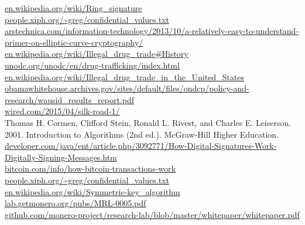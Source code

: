 \documentclass[12pt]{article}
\begin{document}
\url{en.wikipedia.org/wiki/Ring_signature}\\

\url{people.xiph.org/~greg/confidential_values.txt}\\

\url{arstechnica.com/information-technology/2013/10/a-relatively-easy-to-understand-primer-on-elliptic-curve-cryptography/}\\

\url{en.wikipedia.org/wiki/Illegal_drug_trade#History}\\

\url{unodc.org/unodc/en/drug-trafficking/index.html}\\

\url{en.wikipedia.org/wiki/Illegal_drug_trade_in_the_United_States}\\

\url{obamawhitehouse.archives.gov/sites/default/files/ondcp/policy-and-research/wausid_results_report.pdf}\\

\url{wired.com/2015/04/silk-road-1/}\\

Thomas H. Cormen, Clifford Stein, Ronald L. Rivest, and Charles E. Leiserson. 2001. Introduction to Algorithms (2nd ed.). McGraw-Hill Higher Education. \\

\url{developer.com/java/ent/article.php/3092771/How-Digital-Signatures-Work-Digitally-Signing-Messages.htm} \\

\url{bitcoin.com/info/how-bitcoin-transactions-work}\\

\url{people.xiph.org/~greg/confidential_values.txt}\\

\url{en.wikipedia.org/wiki/Symmetric-key_algorithm}\\

\url{lab.getmonero.org/pubs/MRL-0005.pdf}\\

\url{github.com/monero-project/research-lab/blob/master/whitepaper/whitepaper.pdf}\\

\end{document}
